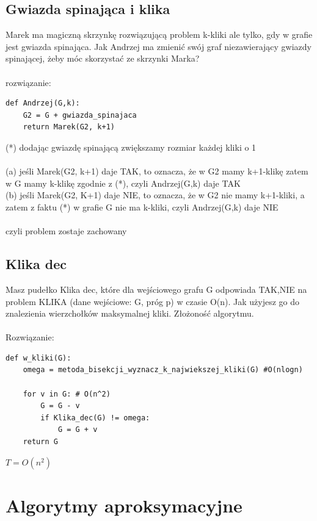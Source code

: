 \documentclass{article}
\begin{document}
\subsection*{Gwiazda spinająca i klika}
Marek ma magiczną skrzynkę rozwiązującą problem k-kliki ale tylko, gdy w grafie jest gwiazda spinająca. 
Jak Andrzej ma zmienić swój graf niezawierający gwiazdy spinającej, żeby móc skorzystać ze skrzynki Marka? \\\\
rozwiązanie:\\
\begin{lstlisting}
def Andrzej(G,k):
	G2 = G + gwiazda_spinajaca
	return Marek(G2, k+1)
\end{lstlisting}
(*) dodając gwiazdę spinającą zwiększamy rozmiar każdej kliki o 1 \\\\
(a) jeśli Marek(G2, k+1) daje TAK, to oznacza, że w G2 mamy k+1-klikę zatem w G mamy k-klikę zgodnie z (*), czyli Andrzej(G,k) daje TAK\\
(b) jeśli Marek(G2, K+1) daje NIE, to oznacza, że w G2 nie mamy k+1-kliki, a zatem z faktu (*) w grafie G nie ma k-kliki, czyli
Andrzej(G,k) daje NIE \\\\
czyli problem zostaje zachowany

\subsection*{Klika dec}
Masz pudełko Klika dec, które dla wejściowego grafu G odpowiada TAK,NIE na problem KLIKA (dane wejściowe: G, próg p) w czasie O(n).
Jak użyjesz go do znalezienia wierzchołków maksymalnej kliki. Złożoność algorytmu. \\\\ Rozwiązanie:
\begin{lstlisting}
def w_kliki(G):
	omega = metoda_bisekcji_wyznacz_k_najwiekszej_kliki(G) #O(nlogn)
	
	for v in G: # O(n^2)
		G = G - v
		if Klika_dec(G) != omega:
			G = G + v	
	return G
\end{lstlisting}
$T = O(n^2)$

\section{Algorytmy aproksymacyjne}
\end{document}
